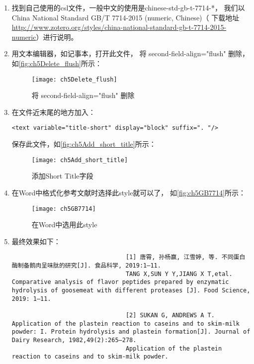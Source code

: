 \documentclass[cn,11pt,chinese]{elegantbook}
\begin{document}
\begin{enumerate}
\begin{figure}[ht]
								\label{fig:ch5Styles}
							\end{figure}
						\item 找到自己使用的csl文件，一般中文的使用是chinese-std-gb-t-7714-*，
							我们以China National Standard GB/T 7714-2015 
							(numeric, Chinese)（
							下载地址\url{http://www.zotero.org/styles/china-national-standard-gb-t-7714-2015-numeric}）进行说明。
						\item 	用文本编辑器，如记事本，打开此文件，
							将 second-field-align="flush" 删除，如\autoref{fig:ch5Delete_flush}所示：
							\begin{figure}[ht]
								\centering
								\texttt{[image: ch5Delete\_flush]}
								\caption{将 second-field-align="flush" 删除}
								\label{fig:ch5Delete_flush}
							\end{figure}
						\item 在文件近末尾的地方加入：
							\begin{lstlisting}[language=VBScript]
								<text variable="title-short" display="block" suffix=". "/>
							\end{lstlisting}
							保存此文件，如\autoref{fig:ch5Add_short_title}所示：
								\begin{figure}[ht]
									\centering
									\texttt{[image: ch5Add\_short\_title]}
									\caption{添加Short Title字段}
									\label{fig:ch5Add_short_title}
								\end{figure}
						\item 在Word中格式化参考文献时选择此style就可以了，
						如\autoref{fig:ch5GB7714}所示：
							\begin{figure}[ht]
								\centering
								\texttt{[image: ch5GB7714]}
								\caption{在Word中选用此style}
								\label{fig:ch5GB7714}
							\end{figure}
						\item 最终效果如下：
							\begin{lstlisting}
								[1] 唐霄, 孙杨赢, 江雪婷, 等. 不同蛋白酶制备鹅肉呈味肽的研究[J]. 食品科学, 2019:1–11. 
								TANG X,SUN Y Y,JIANG X T,etal. Comparative analysis of flavor peptides prepared by enzymatic hydrolysis of goosemeat with different proteases [J]. Food Science, 2019: 1–11.
								
								[2] SUKAN G, ANDREWS A T. Application of the plastein reaction to caseins and to skim-milk powder: I. Protein hydrolysis and plastein formation[J]. Journal of Dairy Research, 1982,49(2):265–278. 
								Application of the plastein reaction to caseins and to skim-milk powder.
								

\end{lstlisting}
\end{enumerate}
\end{document}
